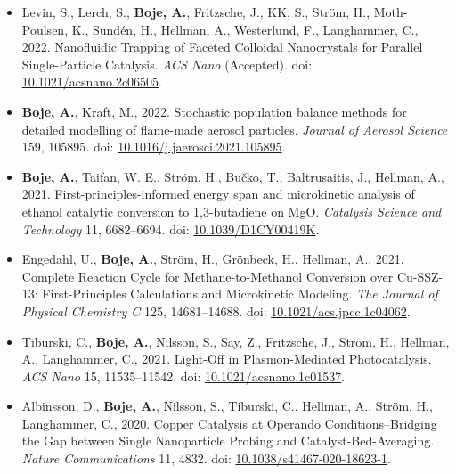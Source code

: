 \documentclass[11pt,a4paper,sans]{moderncv}   %
\def\addls{\vspace{2pt}}
\begin{document}
	\begin{itemize}
		
		\item{Levin, S., Lerch, S., \textbf{{Boje}, A.}, Fritzsche, J., KK, S., Str\"om, H., Moth-Poulsen, K., Sundén, H., Hellman, A., Westerlund, F., Langhammer, C., 2022. Nanofluidic Trapping of Faceted Colloidal Nanocrystals for Parallel Single-Particle Catalysis. \textit{ACS Nano} (Accepted). doi: \textcolor{royalblue}{\href{https://doi.org/10.1021/acsnano.2c06505}{10.1021/acsnano.2c06505}}.}
		
		\addls
		
		\item{\textbf{{Boje}, A.}, {Kraft}, M., 2022. Stochastic population balance methods for detailed modelling of flame-made aerosol particles. \textit{Journal of Aerosol Science} 159, 105895. doi: \textcolor{royalblue}{\href{https://doi.org/10.1016/j.jaerosci.2021.105895}{10.1016/j.jaerosci.2021.105895}}.}
		
		\addls
		
		\item{\textbf{Boje, A.}, Taifan, W. E., Str\"om, H., Bu\v{c}ko, T., Baltrusaitis, J., Hellman, A., 2021. First-principles-informed energy span and microkinetic analysis of ethanol catalytic conversion to 1,3-butadiene on MgO. \textit{Catalysis Science and Technology} 11, 6682--6694. doi: \textcolor{royalblue}{\href{https://doi.org/10.1039/D1CY00419K}{10.1039/D1CY00419K}}.}
		
		\addls
		
		\item{Engedahl, U., \textbf{Boje, A.}, Str\"om, H., Gr\"onbeck, H., Hellman, A., 2021. Complete Reaction Cycle for Methane-to-Methanol Conversion over Cu-SSZ-13: First-Principles Calculations and Microkinetic Modeling. \textit{The Journal of Physical Chemistry C} 125, 14681--14688. doi:  \textcolor{royalblue}{\href{https://doi.org/10.1021/acs.jpcc.1c04062}{10.1021/acs.jpcc.1c04062}}.}
		
		\addls
		
		\item{Tiburski, C., \textbf{Boje, A.}, Nilsson, S., Say, Z., Fritzsche, J., Str\"om, H., Hellman, A., Langhammer, C., 2021. Light-Off in Plasmon-Mediated Photocatalysis. \textit{ACS Nano} 15, 11535--11542. doi:  \textcolor{royalblue}{\href{https://pubs.acs.org/doi/10.1021/acsnano.1c01537}{10.1021/acsnano.1c01537}}.}
		
		\addls
		
		\item{Albinsson, D., \textbf{Boje, A.}, Nilsson, S., Tiburski, C., Hellman, A., Str\"om, H., Langhammer, C., 2020. Copper Catalysis at Operando Conditions–Bridging the Gap between Single Nanoparticle Probing and Catalyst-Bed-Averaging. \textit{Nature Communications} 11, 4832. doi:  \textcolor{royalblue}{\href{https://www.nature.com/articles/s41467-020-18623-1}{10.1038/s41467-020-18623-1}}.}
		

\end{itemize}
\end{document}
